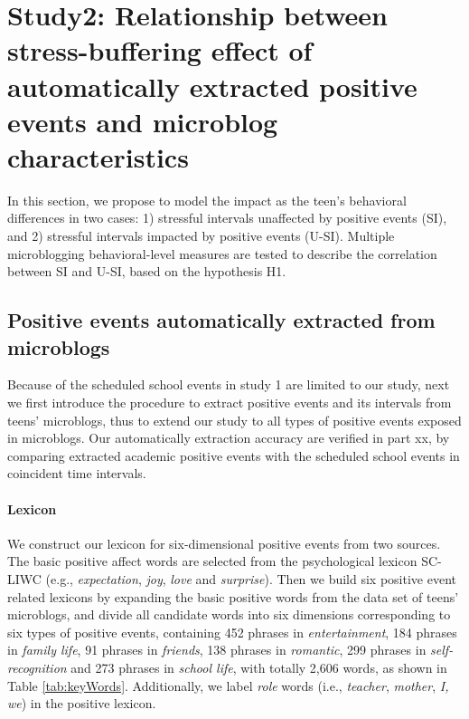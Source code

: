 
\section{Study2: Relationship between stress-buffering effect of automatically extracted positive events and microblog characteristics}
\label{partstudy2}
In this section,
we propose to model the impact as the teen's behavioral differences in two cases:
1) stressful intervals unaffected by positive events (SI),
and 2) stressful intervals impacted by positive events (U-SI).
Multiple microblogging behavioral-level measures are tested to describe the correlation between SI and U-SI,
based on the hypothesis H1.


\subsection{Positive events automatically extracted from microblogs}
Because of the scheduled school events in study 1 are limited to our study,
next we first introduce the procedure to extract positive events and its intervals from teens' microblogs,
thus to extend our study to all types of positive events exposed in microblogs.
Our automatically extraction accuracy are verified in part xx, by comparing extracted academic positive events with the scheduled school events in coincident time intervals.

\paragraph{Lexicon}
We construct our lexicon for six-dimensional positive events from two sources.
The basic positive affect words are selected from the psychological lexicon SC-LIWC (e.g., \emph{expectation}, \emph{joy}, \emph{love} and \emph{surprise})\cite{Tausczik2010The}.
Then we build six positive event related lexicons by expanding the basic positive words from the data set of teens' microblogs,
and divide all candidate words into six dimensions corresponding to six types of positive events,
containing 452 phrases in \emph{entertainment},
184 phrases in \emph{family life},
91 phrases in \emph{friends},
138 phrases in \emph{romantic},
299 phrases in \emph{self-recognition} and 273 phrases in \emph{school life}, with totally 2,606 words,
as shown in Table \ref{tab:keyWords}.
Additionally, we label \emph{role} words (i.e., \emph{teacher}, \emph{mother}, \emph{I, we}) in the positive lexicon.


